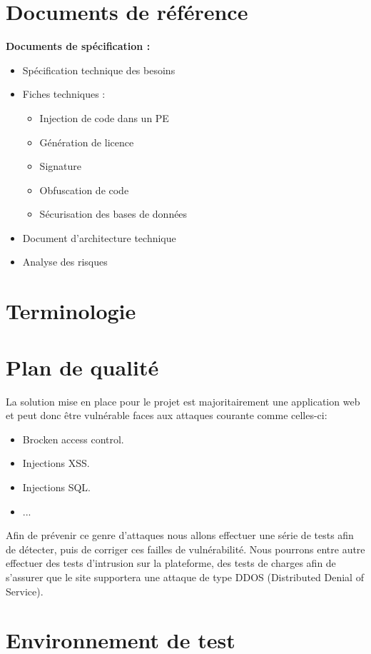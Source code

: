 \chapter{Documents de référence}
\textbf{Documents de spécification :}
\begin{itemize}
    \item Spécification technique des besoins
    \item Fiches techniques :
    \begin{itemize}
        \item Injection de code dans un PE
        \item Génération de licence
        \item Signature
        \item Obfuscation de code
        \item Sécurisation des bases de données
    \end{itemize}
    \item Document d'architecture technique
    \item Analyse des risques
\end{itemize}

\chapter{Terminologie}

\chapter{Plan de qualité}

La solution mise en place pour le projet est majoritairement une application web et 
peut donc être vulnérable faces aux attaques courante comme celles-ci:
\begin{itemize}
    \item Brocken access control.
    \item Injections XSS.
    \item Injections SQL.
    \item ...
\end{itemize}
Afin de prévenir ce genre d'attaques nous allons effectuer une série de tests afin de 
détecter, puis de corriger ces failles de vulnérabilité. Nous pourrons entre autre 
effectuer des tests d'intrusion sur la plateforme, des tests de charges afin de 
s'assurer que le site supportera une attaque de type DDOS 
(Distributed Denial of Service). 

\chapter{Environnement de test}

